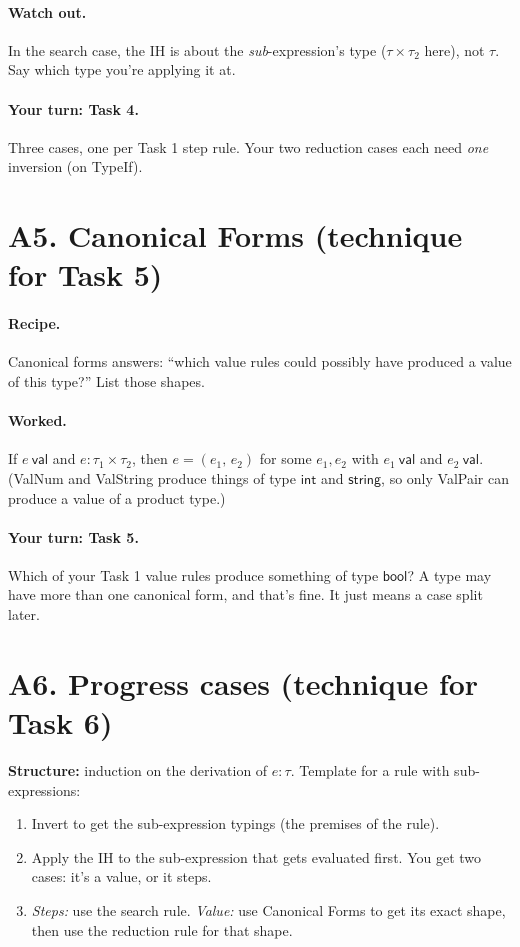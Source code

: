 \documentclass[11pt]{article}
\newcommand{\val}[1]{#1\ \mathsf{val}}
\newcommand{\PAIR}[2]{(#1,\, #2)}
\newcommand{\INT}{\mathsf{int}}
\newcommand{\STRING}{\mathsf{string}}
\begin{document}
\paragraph{Watch out.} In the search case, the IH is about the
\emph{sub}-expression's type ($\tau\times\tau_2$ here), not $\tau$. Say
which type you're applying it at.

\paragraph{Your turn: Task 4.} Three cases, one per Task 1 step rule. Your two
reduction cases each need \emph{one} inversion (on TypeIf).

\section*{A5. Canonical Forms \hfill (technique for Task 5)}

\paragraph{Recipe.} Canonical forms answers: ``which value rules could
possibly have produced a value of this type?'' List those shapes.

\paragraph{Worked.} If $\val{e}$ and $e:\tau_1\times\tau_2$, then
$e=\PAIR{e_1}{e_2}$ for some $e_1,e_2$ with $\val{e_1}$ and $\val{e_2}$.
(ValNum and ValString produce things of type $\INT$ and $\STRING$, so only
ValPair can produce a value of a product type.)

\paragraph{Your turn: Task 5.} Which of your Task 1 value rules produce
something of type $\mathsf{bool}$? A type may have more than one canonical
form, and that's fine. It just means a case split later.

\section*{A6. Progress cases \hfill (technique for Task 6)}

\textbf{Structure:} induction on the derivation of $e:\tau$. Template for a
rule with sub-expressions:
\begin{enumerate}
  \item Invert to get the sub-expression typings (the premises of the rule).
  \item Apply the IH to the sub-expression that gets evaluated first. You
        get two cases: it's a value, or it steps.
  \item \emph{Steps:} use the search rule.\quad
        \emph{Value:} use Canonical Forms to get its exact shape, then use
        the reduction rule for that shape.
\end{enumerate}
\end{document}
